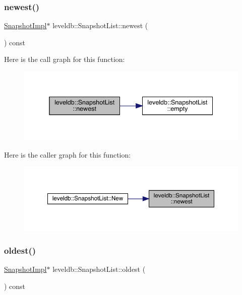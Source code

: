 \subsubsection{\texorpdfstring{newest()}{newest()}}
{\footnotesize\ttfamily \mbox{\hyperlink{classleveldb_1_1_snapshot_impl}{Snapshot\+Impl}}$\ast$ leveldb\+::\+Snapshot\+List\+::newest (\begin{DoxyParamCaption}{ }\end{DoxyParamCaption}) const\hspace{0.3cm}{\ttfamily [inline]}}

Here is the call graph for this function\+:
\nopagebreak
\begin{figure}[H]
\begin{center}
\leavevmode
\includegraphics[width=338pt]{classleveldb_1_1_snapshot_list_ae4480f4d9059d78623773b7e87aad11b_cgraph}
\end{center}
\end{figure}
Here is the caller graph for this function\+:
\nopagebreak
\begin{figure}[H]
\begin{center}
\leavevmode
\includegraphics[width=350pt]{classleveldb_1_1_snapshot_list_ae4480f4d9059d78623773b7e87aad11b_icgraph}
\end{center}
\end{figure}
\mbox{\label{classleveldb_1_1_snapshot_list_a2a7757163b6f737771430e3ea1697963}} 
\subsubsection{\texorpdfstring{oldest()}{oldest()}}
{\footnotesize\ttfamily \mbox{\hyperlink{classleveldb_1_1_snapshot_impl}{Snapshot\+Impl}}$\ast$ leveldb\+::\+Snapshot\+List\+::oldest (\begin{DoxyParamCaption}{ }\end{DoxyParamCaption}) const\hspace{0.3cm}{\ttfamily [inline]}}

